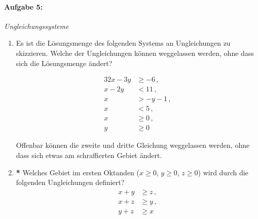 \paragraph{Aufgabe 5: } \emph{Ungleichungssysteme}
\begin{enumerate}[label=(\alph*), labelindent=1em,labelsep=0.5cm]
\item Es ist die Lösungsmenge des folgenden Systems an Ungleichungen zu skizzieren. Welche der Ungleichungen können weggelassen werden, ohne dass sich die Lösungsmenge ändert?

\begin{minipage}{0.2\textwidth}
    \begin{alignat*}{3}
        2x-3y&\geq -6\,,\\
        x-2y&< 11\,,\\
        x&>-y-1\,,\\
        x&<5\,,\\
        x&\geq 0\,,\\
        y&\geq 0
    \end{alignat*}
\end{minipage}
\begin{minipage}{0.8\textwidth}
    \centering
\end{minipage}
Offenbar können die zweite und dritte Gleichung weggelassen werden, ohne dass sich etwas am schraffierten Gebiet ändert. 

\item \textbf{*} Welches Gebiet im ersten Oktanden ($x\ge 0$, $y\ge 0$, $z\ge 0$) wird durch die folgenden Ungleichungen definiert?
\begin{align}
    x+y&\ge z\,,\\
    x+z&\ge y\,,\\
    y+z&\ge x
\end{align}


\end{enumerate}

